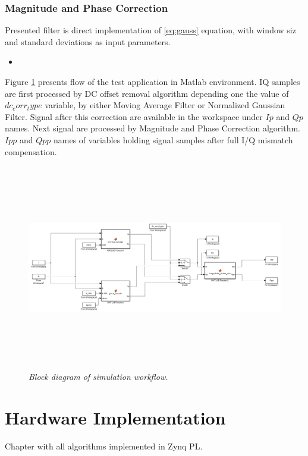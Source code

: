 \documentclass[en,printmode]{mgr}
\begin{document}
	\newpage
	\subsection*{Magnitude and Phase Correction}
		Presented filter is direct implementation of \ref{eq:gauss} equation, with window siz and
		standard deviations as input parameters.
		\begin{itemize}[label={}]
			\item 
		\end{itemize}
		
	Figure \ref{fig:flow} presents flow of the test application in Matlab environment. IQ samples are first
	processed by DC offset removal algorithm depending one the value of $dc_corr_type$ variable, by either
	Moving Average Filter or Normalized Gaussian Filter. Signal after this correction are available in the
	workspace under $Ip$ and $Qp$ names. Next signal are processed by Magnitude and Phase Correction algorithm.
	$Ipp$ and $Qpp$ names of variables holding signal samples after full I/Q mismatch compensation.
	\begin{center}\centering
		\begin{figure}[!htb]
   		\centering
   		\includegraphics[height=9cm, angle =90]{images/simulink.png}
    	\caption{\textit{Block diagram of simulation workflow.}} \label{fig:flow}
		\end{figure}
	\end{center}		
	
\chapter{Hardware Implementation}
Chapter with all algorithms implemented in Zynq PL.
\end{document}
